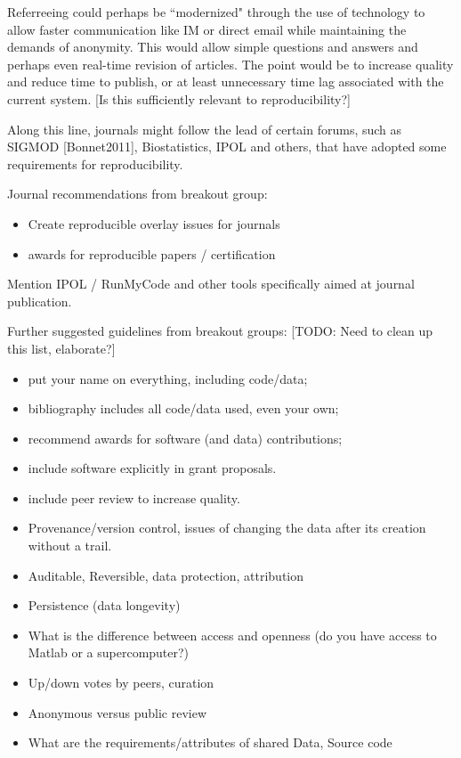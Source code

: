 \documentclass[11pt]{article}
\newcommand{\todo}[1]{{\color{red} [TODO: #1]}}
\newcommand{\comment}[1]{{\color{blue} [#1]}}
\newcommand{\todo}[1]{}
\newcommand{\comment}[1]{}
\begin{document}
Referreeing could perhaps be ``modernized" through the use of technology to
allow faster communication like IM or direct email while
maintaining the demands of anonymity.  This would allow simple questions and
answers and perhaps even real-time revision of articles.  The point would be
to increase quality and reduce time to publish, or at least unnecessary time
lag associated with the current system. \comment{Is this sufficiently
relevant to reproducibility?}

Along this line, journals might follow the lead of certain forums, such as
SIGMOD [Bonnet2011], Biostatistics, IPOL and others, that have adopted some
requirements for reproducibility. 

Journal recommendations from breakout group:

\begin{itemize} 
\item Create reproducible overlay issues for journals
\item awards for reproducible papers / certification
\end{itemize} 

Mention IPOL / RunMyCode and other tools specifically aimed at journal
publication.

Further suggested guidelines from breakout groups:
\todo{Need to clean up this list, elaborate?}

\begin{itemize} 
\item    put your name on everything, including code/data;
\item    bibliography includes all code/data used, even your own;
\item    recommend awards for software (and data) contributions;
\item    include software explicitly in grant proposals.

\item   include peer review to increase quality.
\item   Provenance/version control, issues of changing the data after its
creation without a trail.
\item   Auditable, Reversible, data protection, attribution
\item   Persistence (data longevity)
\item   What is the difference between access and openness (do you have access
to Matlab or a supercomputer?)
\item   Up/down votes by peers, curation
\item   Anonymous versus public review
\item   What are the requirements/attributes of shared Data, Source code
\end{itemize} 
\end{document}
